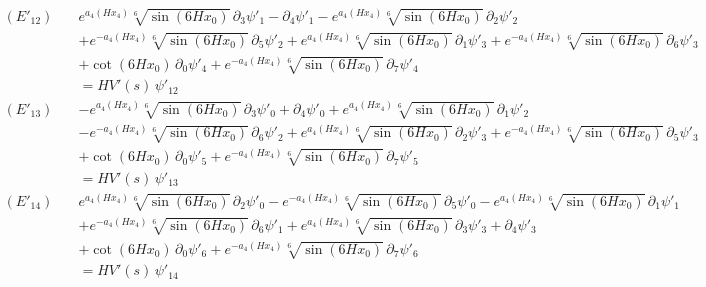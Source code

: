 \begin{align*}
(E'_{12})\quad & e^{a_4\left(H x_4\right)} \sqrt[6]{\sin \left(6 H x_0\right)}\,\partial_{3}\psi'_{1} - \partial_{4}\psi'_{1} - e^{a_4\left(H x_4\right)} \sqrt[6]{\sin \left(6 H x_0\right)}\,\partial_{2}\psi'_{2} \\
 &  + e^{-a_4\left(H x_4\right)} \sqrt[6]{\sin \left(6 H x_0\right)}\,\partial_{5}\psi'_{2} + e^{a_4\left(H x_4\right)} \sqrt[6]{\sin \left(6 H x_0\right)}\,\partial_{1}\psi'_{3} + e^{-a_4\left(H x_4\right)} \sqrt[6]{\sin \left(6 H x_0\right)}\,\partial_{6}\psi'_{3} \\
 &  + \cot \left(6 H x_0\right)\,\partial_{0}\psi'_{4} + e^{-a_4\left(H x_4\right)} \sqrt[6]{\sin \left(6 H x_0\right)}\,\partial_{7}\psi'_{4} \\
 & = H V'(s)\,\psi'_{12}
\end{align*}
\begin{align*}
(E'_{13})\quad & -e^{a_4\left(H x_4\right)} \sqrt[6]{\sin \left(6 H x_0\right)}\,\partial_{3}\psi'_{0} + \partial_{4}\psi'_{0} + e^{a_4\left(H x_4\right)} \sqrt[6]{\sin \left(6 H x_0\right)}\,\partial_{1}\psi'_{2} \\
 &  - e^{-a_4\left(H x_4\right)} \sqrt[6]{\sin \left(6 H x_0\right)}\,\partial_{6}\psi'_{2} + e^{a_4\left(H x_4\right)} \sqrt[6]{\sin \left(6 H x_0\right)}\,\partial_{2}\psi'_{3} + e^{-a_4\left(H x_4\right)} \sqrt[6]{\sin \left(6 H x_0\right)}\,\partial_{5}\psi'_{3} \\
 &  + \cot \left(6 H x_0\right)\,\partial_{0}\psi'_{5} + e^{-a_4\left(H x_4\right)} \sqrt[6]{\sin \left(6 H x_0\right)}\,\partial_{7}\psi'_{5} \\
 & = H V'(s)\,\psi'_{13}
\end{align*}
\begin{align*}
(E'_{14})\quad & e^{a_4\left(H x_4\right)} \sqrt[6]{\sin \left(6 H x_0\right)}\,\partial_{2}\psi'_{0} - e^{-a_4\left(H x_4\right)} \sqrt[6]{\sin \left(6 H x_0\right)}\,\partial_{5}\psi'_{0} - e^{a_4\left(H x_4\right)} \sqrt[6]{\sin \left(6 H x_0\right)}\,\partial_{1}\psi'_{1} \\
 &  + e^{-a_4\left(H x_4\right)} \sqrt[6]{\sin \left(6 H x_0\right)}\,\partial_{6}\psi'_{1} + e^{a_4\left(H x_4\right)} \sqrt[6]{\sin \left(6 H x_0\right)}\,\partial_{3}\psi'_{3} + \partial_{4}\psi'_{3} \\
 &  + \cot \left(6 H x_0\right)\,\partial_{0}\psi'_{6} + e^{-a_4\left(H x_4\right)} \sqrt[6]{\sin \left(6 H x_0\right)}\,\partial_{7}\psi'_{6} \\
 & = H V'(s)\,\psi'_{14}
\end{align*}
